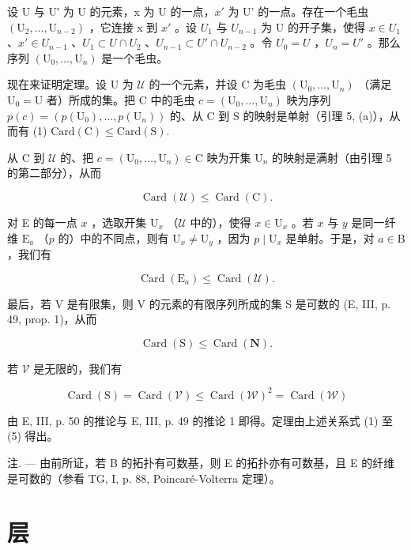 设 U 与 U′ 为 U 的元素，x 为 U 的一点，\(x'\) 为 U' 的一点。存在一个毛虫 \((\mathrm{U}_{2},\ldots,\mathrm{U}_{n-2})\) ，它连接 x 到 \(x'\) 。设 \(U_{1}\) 与 \(U_{n-1}\) 为 U 的开子集，使得 \(x \in U_{1}\) 、\(x' \in U_{n-1}\) 、\(U_{1} \subset U \cap U_{2}\) 、\(U_{n-1} \subset U' \cap U_{n-2}\) 。令 \(U_{0} = U\) ，\(U_{n} = U'\) 。那么序列 \((\mathrm{U}_{0},\ldots,\mathrm{U}_{n})\) 是一个毛虫。

现在来证明定理。设 U 为 \(\mathcal{U}\) 的一个元素，并设 C 为毛虫 \((\mathrm{U}_0,\dots ,\mathrm{U}_n)\) （满足 \(\mathrm{U}_0 = \mathrm{U}\) 者）所成的集。把 C 中的毛虫 \(c = (\mathrm{U}_0,\dots ,\mathrm{U}_n)\) 映为序列 \(p(c) = (p(\mathrm{U}_{0}), \ldots, p(\mathrm{U}_{n}))\) 的、从 C 到 S 的映射是单射（引理 5, (a)），从而有 (1) \(\text{Card}(\mathrm{C}) \leqslant \text{Card}(\mathrm{S}).\)

从 C 到 \(\mathcal{U}\) 的、把 \(c = (\mathrm{U}_0,\dots ,\mathrm{U}_n)\in \mathrm{C}\) 映为开集 \(\mathrm{U}_n\) 的映射是满射（由引理 5 的第二部分），从而

\[
\operatorname{Card} (\mathcal {U}) \leqslant \operatorname{Card} (\mathrm{C}).\tag{2}
\]

对 E 的每一点 \(x\) ，选取开集 \(\mathrm{U}_x\) （\(\mathcal{U}\) 中的），使得 \(x \in \mathrm{U}_x\) 。若 \(x\) 与 \(y\) 是同一纤维 \(\mathrm{E}_a\) （\(p\) 的）中的不同点，则有 \(\mathrm{U}_x \neq \mathrm{U}_y\) ，因为 \(p \mid \mathrm{U}_x\) 是单射。于是，对 \(a \in \mathrm{B}\) ，我们有

\[
\operatorname{Card} \left(\mathrm{E} _ {a}\right) \leqslant \operatorname{Card} (\mathcal {U}).\tag{3}
\]

最后，若 V 是有限集，则 V 的元素的有限序列所成的集 S 是可数的 (E, III, p. 49, prop. 1)，从而

\[
\operatorname{Card} (\mathrm{S}) \leqslant \operatorname{Card} (\mathbf {N}).\tag{4}
\]

若 \(\mathcal{V}\) 是无限的，我们有

\[
\operatorname{Card} (\mathrm{S}) = \operatorname{Card} (\mathcal {V}) \leqslant \operatorname{Card} (\mathcal {W}) ^ {2} = \operatorname{Card} (\mathcal {W})\tag{5}
\]

由 E, III, p. 50 的推论与 E, III, p. 49 的推论 1 即得。定理由上述关系式 (1) 至 (5) 得出。

注. --- 由前所证，若 B 的拓扑有可数基，则 E 的拓扑亦有可数基，且 E 的纤维是可数的（参看 TG, I, p. 88, Poincaré-Volterra 定理）。

\section{层}

